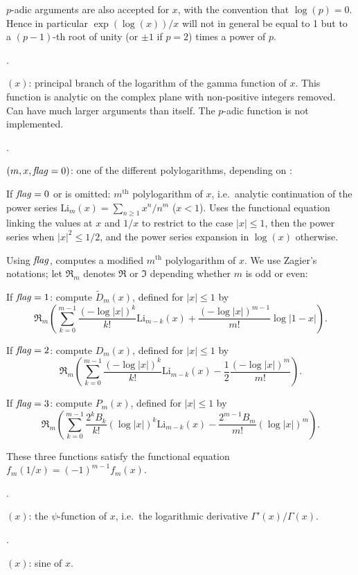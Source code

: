 $p$-adic arguments are also accepted for $x$, with the convention that
$\log(p)=0$. Hence in particular $\exp(\log(x))/x$ will not in general be
equal to 1 but to a $(p-1)$-th root of unity (or $\pm1$ if $p=2$)
times a power of $p$.

.

$(x)$: principal branch of the logarithm of the gamma
function of $x$. This function is analytic on the complex plane with
non-positive integers removed. Can have much larger arguments than 
itself. The $p$-adic  function is not implemented.

.

$(m,x,{\hbox{\it f\kern0pt lag\/}=0})$: one of the different polylogarithms,
depending on \fl:

If $\hbox{\it f\kern0pt lag\/}=0$ or is omitted: $m^\text{th}$ polylogarithm of $x$, i.e.~analytic
continuation of the power series $\text{Li}_m(x)=\sum_{n\ge1}x^n/n^m$
($x < 1$). Uses the functional equation linking the values at $x$ and $1/x$
to restrict to the case $|x|\leq 1$, then the power series when
$|x|^2\le1/2$, and the power series expansion in $\log(x)$ otherwise.

Using $\hbox{\it f\kern0pt lag\/}$, computes a modified $m^\text{th}$ polylogarithm of $x$.
We use Zagier's notations; let $\Re_m$ denotes $\Re$ or $\Im$ depending
whether $m$ is odd or even:

If $\hbox{\it f\kern0pt lag\/}=1$: compute $\tilde D_m(x)$, defined for $|x|\le1$ by
$$\Re_m\left(\sum_{k=0}^{m-1} \dfrac{(-\log|x|)^k}{k!}\text{Li}_{m-k}(x)
+\dfrac{(-\log|x|)^{m-1}}{m!}\log|1-x|\right).$$

If $\hbox{\it f\kern0pt lag\/}=2$: compute $D_m(x)$, defined for $|x|\le1$ by
$$\Re_m\left(\sum_{k=0}^{m-1}\dfrac{(-\log|x|)^k}{k!}\text{Li}_{m-k}(x)
-\dfrac{1}{2}\dfrac{(-\log|x|)^m}{m!}\right).$$

If $\hbox{\it f\kern0pt lag\/}=3$: compute $P_m(x)$, defined for $|x|\le1$ by
$$\Re_m\left(\sum_{k=0}^{m-1}\dfrac{2^kB_k}{k!}(\log|x|)^k\text{Li}_{m-k}(x)
-\dfrac{2^{m-1}B_m}{m!}(\log|x|)^m\right).$$

These three functions satisfy the functional equation
$f_m(1/x) = (-1)^{m-1}f_m(x)$.

.

$(x)$: the $\psi$-function of $x$, i.e.~the
logarithmic derivative $\Gamma'(x)/\Gamma(x)$.

.

$(x)$: sine of $x$.

